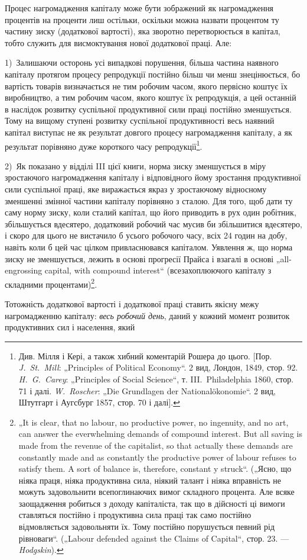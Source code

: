 Процес нагромадження капіталу може бути зображений як
нагромадження процентів на проценти лиш остільки, оскільки
можна назвати процентом ту частину зиску (додаткової вартості),
яка зворотно перетворюється в капітал, тобто служить для висмоктування
нової додаткової праці. Але:

1)~Залишаючи осторонь усі випадкові порушення, більша частина
наявного капіталу протягом процесу репродукції постійно
більш чи менш знецінюється, бо вартість товарів визначається
не тим робочим часом, якого первісно коштує їх виробництво,
а тим робочим часом, якого коштує їх репродукція, а цей останній
в наслідок розвитку суспільної продуктивної сили праці постійно
зменшується. Тому на вищому ступені розвитку суспільної
продуктивності весь наявний капітал виступає не як результат
довгого процесу нагромадження капіталу, а як результат
порівняно дуже короткого часу репродукції\footnote{
Див. Мілля і Кері, а також хибний коментарій Рошера до цього. [Пор.
\emph{J.~St.~Mill}: „Principles of Political Economy“. 2 вид, Лондон, 1849, стор. 92. \emph{H.~G.~Carey}: „Principles of Social Science“, т. III.~Philadelphia 1860, стор. 71 і далі.
\emph{W.~Roscher}: „Die Grundlagen der Nationalökonomie“. 2 вид, Штутгарт і Аугсбург
1857, стор. 70 і далі].
}.

2)~Як показано у відділі III цієї книги, норма зиску зменшується
в міру зростаючого нагромадження капіталу і відповідного
йому зростання продуктивної сили суспільної праці, яке
виражається якраз у зростаючому відносному зменшенні змінної
частини капіталу порівняно з сталою. Для того, щоб дати ту
саму норму зиску, коли сталий капітал, що його приводить в рух
один робітник, збільшується вдесятеро, додатковий робочий час
мусив би збільшитися вдесятеро, і скоро для цього не вистачило
б усього робочого часу, всіх 24 годин на добу, навіть
коли б цей час цілком привласнювався капіталом. Уявлення ж, що
норма зиску не зменшується, лежить в основі прогресії Прайса
і взагалі в основі „all-engrossing capital, with compound interest“
(всезахоплюючого капіталу з складними процентами)\footnote{
„It is clear, that no labour, no productive power, no ingenuity, and no art,
can answer the everwhelming demands of compound interest. But all saving is
made from the revenue of the capitalist, so that actually these demands are constantly
made and as constantly the productive power of labour refuses to satisfy
them. A sort of balance is, therefore, constant y struck“. („Ясно, що ніяка праця,
ніяка продуктивна сила, ніякий талант і ніяка вправність не можуть задовольнити
всепоглинаючих вимог складного процента. Але всяке заощадження робиться з
доходу капіталіста, так що в дійсності ці вимоги ставляться постійно і продуктивна сила праці так
само постійно відмовляється задовольняти їх. Тому
постійно порушується певний рід рівноваги“. („Labour defended against the Claims
of Capital“, стор. 23. — \emph{Hodgskin}).
}.

Тотожність додаткової вартості і додаткової праці ставить
якісну межу нагромадженню капіталу: \emph{весь робочий день}, даний
у кожний момент розвиток продуктивних сил і населення, який
\parbreak{}  %
